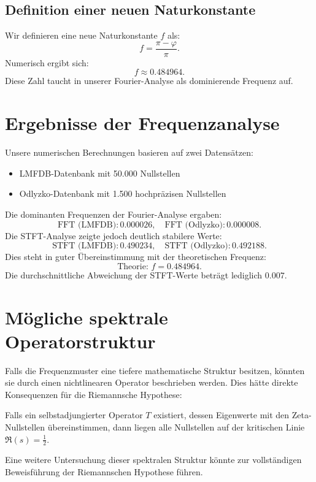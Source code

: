 \documentclass[a4paper,12pt]{article}
\begin{document}
\subsection{Definition einer neuen Naturkonstante}
Wir definieren eine neue Naturkonstante $f$ als:
\begin{equation}
f = \frac{\pi - \varphi}{\pi}.
\end{equation}
Numerisch ergibt sich:
\begin{equation}
f \approx 0.484964.
\end{equation}
Diese Zahl taucht in unserer Fourier-Analyse als dominierende Frequenz auf.

\section{Ergebnisse der Frequenzanalyse}
Unsere numerischen Berechnungen basieren auf zwei Datensätzen:
\begin{itemize}
    \item LMFDB-Datenbank mit 50.000 Nullstellen
    \item Odlyzko-Datenbank mit 1.500 hochpräzisen Nullstellen
\end{itemize}
Die dominanten Frequenzen der Fourier-Analyse ergaben:
\begin{equation}
\text{FFT (LMFDB)}: 0.000026, \quad \text{FFT (Odlyzko)}: 0.000008.
\end{equation}
Die STFT-Analyse zeigte jedoch deutlich stabilere Werte:
\begin{equation}
\text{STFT (LMFDB)}: 0.490234, \quad \text{STFT (Odlyzko)}: 0.492188.
\end{equation}
Dies steht in guter Übereinstimmung mit der theoretischen Frequenz:
\begin{equation}
\text{Theorie: } f = 0.484964.
\end{equation}
Die durchschnittliche Abweichung der STFT-Werte beträgt lediglich $0.007$.

\section{Mögliche spektrale Operatorstruktur}
Falls die Frequenzmuster eine tiefere mathematische Struktur besitzen, könnten sie durch einen nichtlinearen Operator beschrieben werden.
Dies hätte direkte Konsequenzen für die Riemannsche Hypothese:
\begin{theorem}
Falls ein selbstadjungierter Operator $T$ existiert, dessen Eigenwerte mit den Zeta-Nullstellen übereinstimmen, dann liegen alle Nullstellen auf der kritischen Linie $\Re(s) = \frac{1}{2}$.
\end{theorem}
Eine weitere Untersuchung dieser spektralen Struktur könnte zur vollständigen Beweisführung der Riemannschen Hypothese führen.
\end{document}
